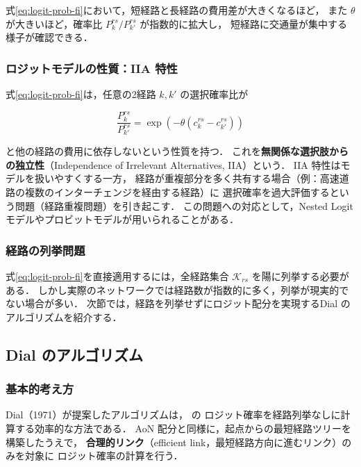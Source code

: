 式\eqref{eq:logit-prob-fi}において，短経路と長経路の費用差が大きくなるほど，
また $\theta$ が大きいほど，確率比 $P_k^{rs}/P_{k'}^{rs}$ が指数的に拡大し，
短経路に交通量が集中する様子が確認できる．

\subsubsection*{ロジットモデルの性質：IIA 特性}

式\eqref{eq:logit-prob-fi}は，任意の2経路 $k, k'$ の選択確率比が

\begin{equation}
  \frac{P_k^{rs}}{P_{k'}^{rs}} = \exp\!\left(-\theta(c_k^{rs} - c_{k'}^{rs})\right)
  \label{eq:iia}
\end{equation}

と他の経路の費用に依存しないという性質を持つ．
これを\textbf{無関係な選択肢からの独立性}（Independence of Irrelevant Alternatives, IIA）という\cite{McFadden1974}．
IIA 特性はモデルを扱いやすくする一方，
経路が重複部分を多く共有する場合（例：高速道路の複数のインターチェンジを経由する経路）に
選択確率を過大評価するという問題（経路重複問題）を引き起こす．
この問題への対応として，Nested Logit モデルやプロビットモデルが用いられることがある\cite{Daganzo1977}．

\subsubsection*{経路の列挙問題}

式\eqref{eq:logit-prob-fi}を直接適用するには，全経路集合 $\mathcal{K}_{rs}$ を陽に列挙する必要がある．
しかし実際のネットワークでは経路数が指数的に多く，列挙が現実的でない場合が多い．
次節では，経路を列挙せずにロジット配分を実現するDial のアルゴリズムを紹介する．

\subsection{Dial のアルゴリズム}
\label{subsec:dial-algorithm}

\subsubsection*{基本的考え方}

Dial（1971）が提案したアルゴリズムは， の
ロジット確率を経路列挙なしに計算する効率的な方法である\cite{Dial1971}．
AoN 配分と同様に，起点からの最短経路ツリーを構築したうえで，
\textbf{合理的リンク}（efficient link，最短経路方向に進むリンク）のみを対象に
ロジット確率の計算を行う．

